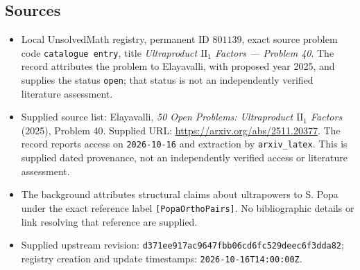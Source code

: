 \documentclass[11pt]{article}
\begin{document}
\subsection{Sources}
\begin{itemize}
\item Local UnsolvedMath registry, permanent ID \(801139\), exact source problem code \texttt{catalogue entry}, title \emph{Ultraproduct \(\mathrm{II}_1\) Factors --- Problem 40}. The record attributes the problem to Elayavalli, with proposed year 2025, and supplies the status \texttt{open}; that status is not an independently verified literature assessment.
\item Supplied source list: Elayavalli, \emph{50 Open Problems: Ultraproduct \(\mathrm{II}_1\) Factors} (2025), Problem 40. Supplied URL: \url{https://arxiv.org/abs/2511.20377}. The record reports access on \texttt{2026-10-16} and extraction by \texttt{arxiv\_latex}. This is supplied dated provenance, not an independently verified access or literature assessment.
\item The background attributes structural claims about ultrapowers to S. Popa under the exact reference label \texttt{[PopaOrthoPairs]}. No bibliographic details or link resolving that reference are supplied.
\item Supplied upstream revision: \texttt{d371ee917ac9647fbb06cd6fc529deec6f3dda82}; registry creation and update timestamps: \texttt{2026-10-16T14:00:00Z}.
\end{itemize}
\end{document}
